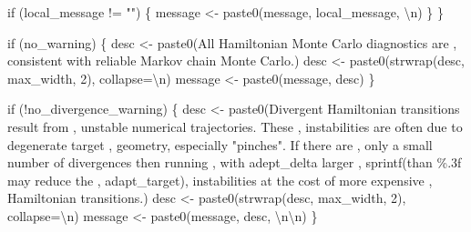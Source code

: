 \documentclass[
  letterpaper,
  DIV=11,
  numbers=noendperiod]{scrartcl}
\newenvironment{Shaded}{\begin{snugshade}}{\end{snugshade}}
\newcommand{\CharTok}[1]{\textcolor[rgb]{0.13,0.47,0.30}{#1}}
\newcommand{\ControlFlowTok}[1]{\textcolor[rgb]{0.00,0.23,0.31}{#1}}
\newcommand{\DecValTok}[1]{\textcolor[rgb]{0.68,0.00,0.00}{#1}}
\newcommand{\NormalTok}[1]{\textcolor[rgb]{0.00,0.23,0.31}{#1}}
\newcommand{\OperatorTok}[1]{\textcolor[rgb]{0.37,0.37,0.37}{#1}}
\newcommand{\SpecialCharTok}[1]{\textcolor[rgb]{0.37,0.37,0.37}{#1}}
\newcommand{\StringTok}[1]{\textcolor[rgb]{0.13,0.47,0.30}{#1}}
\begin{document}
\begin{Shaded}
\begin{Highlighting}[]
    \ControlFlowTok{if}\NormalTok{ (local\_message }\OperatorTok{!=} \StringTok{""}\NormalTok{) \{}
\NormalTok{      message }\OperatorTok{\textless{}{-}}\NormalTok{ paste0(message, local\_message, }\StringTok{\textquotesingle{}}\CharTok{\textbackslash{}n}\StringTok{\textquotesingle{}}\NormalTok{)}
\NormalTok{    \}}
\NormalTok{  \}}

  \ControlFlowTok{if}\NormalTok{ (no\_warning) \{}
\NormalTok{    desc }\OperatorTok{\textless{}{-}}\NormalTok{ paste0(}\StringTok{\textquotesingle{}All Hamiltonian Monte Carlo diagnostics are \textquotesingle{}}\NormalTok{,}
                   \StringTok{\textquotesingle{}consistent with reliable Markov chain Monte Carlo.\textquotesingle{}}\NormalTok{)}
\NormalTok{    desc }\OperatorTok{\textless{}{-}}\NormalTok{ paste0(strwrap(desc, max\_width, }\DecValTok{2}\NormalTok{), collapse}\OperatorTok{=}\StringTok{\textquotesingle{}}\CharTok{\textbackslash{}n}\StringTok{\textquotesingle{}}\NormalTok{)}
\NormalTok{    message }\OperatorTok{\textless{}{-}}\NormalTok{ paste0(message, desc)}
\NormalTok{  \}}
  
  \ControlFlowTok{if}\NormalTok{ (}\OperatorTok{!}\NormalTok{no\_divergence\_warning) \{}
\NormalTok{    desc }\OperatorTok{\textless{}{-}}\NormalTok{ paste0(}\StringTok{\textquotesingle{}Divergent Hamiltonian transitions result from \textquotesingle{}}\NormalTok{,}
                   \StringTok{\textquotesingle{}unstable numerical trajectories.  These \textquotesingle{}}\NormalTok{,}
                   \StringTok{\textquotesingle{}instabilities are often due to degenerate target \textquotesingle{}}\NormalTok{,}
                   \StringTok{\textquotesingle{}geometry, especially "pinches".  If there are \textquotesingle{}}\NormalTok{,}
                   \StringTok{\textquotesingle{}only a small number of divergences then running \textquotesingle{}}\NormalTok{,}
                   \StringTok{\textquotesingle{}with adept\_delta larger \textquotesingle{}}\NormalTok{,}
\NormalTok{                   sprintf(}\StringTok{\textquotesingle{}than }\SpecialCharTok{\%.3f}\StringTok{ may reduce the \textquotesingle{}}\NormalTok{, adapt\_target),}
                   \StringTok{\textquotesingle{}instabilities at the cost of more expensive \textquotesingle{}}\NormalTok{,}
                   \StringTok{\textquotesingle{}Hamiltonian transitions.\textquotesingle{}}\NormalTok{)}
\NormalTok{    desc }\OperatorTok{\textless{}{-}}\NormalTok{ paste0(strwrap(desc, max\_width, }\DecValTok{2}\NormalTok{), collapse}\OperatorTok{=}\StringTok{\textquotesingle{}}\CharTok{\textbackslash{}n}\StringTok{\textquotesingle{}}\NormalTok{)}
\NormalTok{    message }\OperatorTok{\textless{}{-}}\NormalTok{ paste0(message, desc, }\StringTok{\textquotesingle{}}\CharTok{\textbackslash{}n\textbackslash{}n}\StringTok{\textquotesingle{}}\NormalTok{)}
\NormalTok{  \}}


\end{Highlighting}
\end{Shaded}
\end{document}
